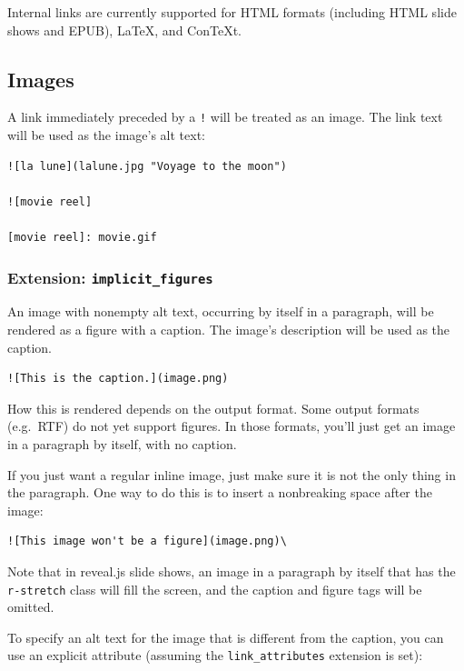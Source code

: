 \documentclass[
]{article}
\begin{document}
Internal links are currently supported for HTML formats (including HTML
slide shows and EPUB), LaTeX, and ConTeXt.

\hypertarget{images}{%
\subsection{Images}\label{images}}

A link immediately preceded by a \texttt{!} will be treated as an image.
The link text will be used as the image's alt text:

\begin{verbatim}
![la lune](lalune.jpg "Voyage to the moon")

![movie reel]

[movie reel]: movie.gif
\end{verbatim}

\hypertarget{extension-implicit_figures}{%
\subsubsection{\texorpdfstring{Extension:
\texttt{implicit\_figures}}{Extension: implicit\_figures}}\label{extension-implicit_figures}}

An image with nonempty alt text, occurring by itself in a paragraph,
will be rendered as a figure with a caption. The image's description
will be used as the caption.

\begin{verbatim}
![This is the caption.](image.png)
\end{verbatim}

How this is rendered depends on the output format. Some output formats
(e.g.~RTF) do not yet support figures. In those formats, you'll just get
an image in a paragraph by itself, with no caption.

If you just want a regular inline image, just make sure it is not the
only thing in the paragraph. One way to do this is to insert a
nonbreaking space after the image:

\begin{verbatim}
![This image won't be a figure](image.png)\
\end{verbatim}

Note that in reveal.js slide shows, an image in a paragraph by itself
that has the \texttt{r-stretch} class will fill the screen, and the
caption and figure tags will be omitted.

To specify an alt text for the image that is different from the caption,
you can use an explicit attribute (assuming the
\texttt{link\_attributes} extension is set):
\end{document}
